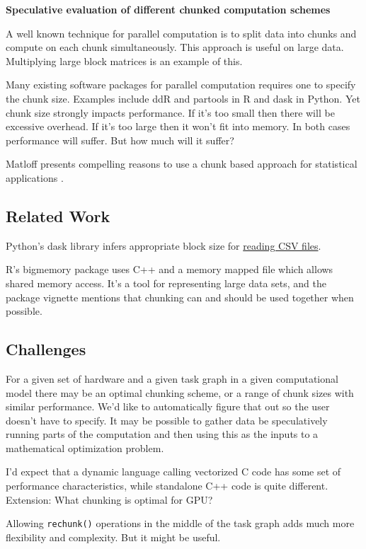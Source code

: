 \documentclass[12pt]{article}
\begin{document}
\textbf{Speculative evaluation of different chunked computation schemes}

A well known technique for parallel computation is to split data into
chunks and compute on each chunk simultaneously. This approach 
is useful on large data. Multiplying large block matrices is an example of this.

Many existing software packages for parallel computation requires one to specify the
chunk size. Examples include ddR \cite{R-ddR} and partools
\cite{R-partools} in R and dask in Python.
Yet chunk size strongly impacts
performance. If it's too small then there will be excessive overhead. If
it's too large then it won't fit into memory. In both cases performance
will suffer. But how much will it suffer?

Matloff presents compelling reasons to use a chunk based
approach for statistical applications \cite{matloff2014software}.

\subsection{Related Work}

Python's dask library infers appropriate block size for
\href{https://github.com/dask/dask/pull/1328}{reading CSV files}.

R's bigmemory package uses C++ and a memory mapped file which allows shared
memory access. \cite{kane2010bigmemory} It's a tool for representing large
data sets, and the package vignette mentions that chunking can and should
be used together when possible.

\subsection{Challenges}

For a given set of hardware and a given task graph in a given
computational model there may be
an optimal chunking scheme, or a range of chunk sizes with similar performance.
We'd like to automatically figure that out so the user doesn't have to
specify. It may be possible to gather data be speculatively running parts
of the computation and then using this as the inputs to a 
mathematical optimization problem.

I'd expect that a dynamic language calling vectorized C code has some set
of performance characteristics, while standalone C++ code is quite
different.
Extension: What chunking is optimal for GPU?

Allowing \texttt{rechunk()} operations in the middle of the task graph adds
much more flexibility and complexity. But it might be useful.
\end{document}
